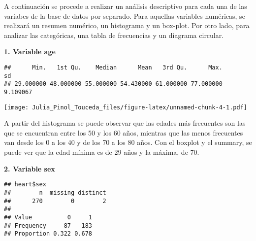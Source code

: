 \documentclass[]{article}
\newenvironment{Shaded}{\begin{snugshade}}{\end{snugshade}}
\newcommand{\KeywordTok}[1]{\textcolor[rgb]{0.13,0.29,0.53}{\textbf{#1}}}
\newcommand{\DataTypeTok}[1]{\textcolor[rgb]{0.13,0.29,0.53}{#1}}
\newcommand{\DecValTok}[1]{\textcolor[rgb]{0.00,0.00,0.81}{#1}}
\newcommand{\StringTok}[1]{\textcolor[rgb]{0.31,0.60,0.02}{#1}}
\newcommand{\OperatorTok}[1]{\textcolor[rgb]{0.81,0.36,0.00}{\textbf{#1}}}
\newcommand{\NormalTok}[1]{#1}
\begin{document}
A continuación se procede a realizar un análisis descriptivo para cada
una de las variabes de la base de datos por separado. Para aquellas
variables numéricas, se realizará un resumen numérico, un histograma y
un box-plot. Por otro lado, para analizar las categóricas, una tabla de
frecuencias y un diagrama circular.

\textbf{1. Variable age}

\begin{verbatim}
##      Min.   1st Qu.    Median      Mean   3rd Qu.      Max.        sd 
## 29.000000 48.000000 55.000000 54.430000 61.000000 77.000000  9.109067
\end{verbatim}

\texttt{[image: Julia\_Pinol\_Touceda\_files/figure-latex/unnamed-chunk-4-1.pdf]}

A partir del histograma se puede observar que las edades más frecuentes
son las que se encuentran entre los 50 y los 60 años, mientras que las
menos frecuentes van desde los 0 a los 40 y de los 70 a los 80 años. Con
el boxplot y el summary, se puede ver que la edad mínima es de 29 años y
la máxima, de 70.

\textbf{2. Variable sex}

\begin{Shaded}
\end{Shaded}

\begin{verbatim}
## heart$sex 
##        n  missing distinct 
##      270        0        2 
##                       
## Value          0     1
## Frequency     87   183
## Proportion 0.322 0.678
\end{verbatim}

\begin{Shaded}
\end{Shaded}
\end{document}
